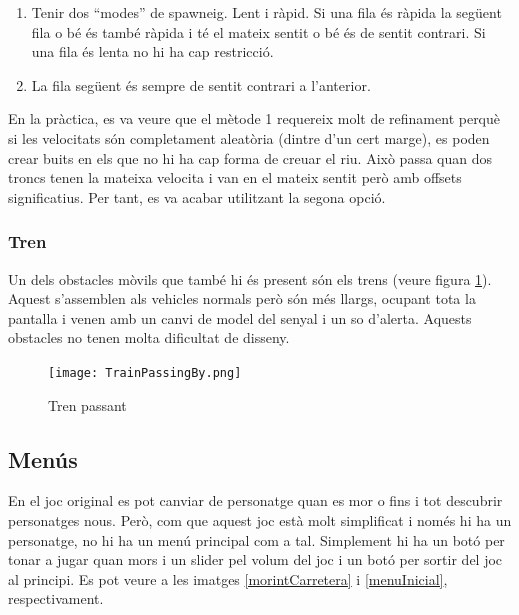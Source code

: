\documentclass{article}
\begin{document}
\begin{enumerate}
	\item Tenir dos ``modes'' de spawneig. Lent i ràpid. Si una fila és
	ràpida la següent fila o bé és també ràpida i té el mateix sentit
	o bé és de sentit contrari. Si una fila és lenta no hi ha cap restricció.
	\item La fila següent és sempre de sentit contrari a l'anterior.
\end{enumerate}
En la pràctica, es va veure que el mètode 1 requereix molt de refinament perquè
si les velocitats són completament aleatòria (dintre d'un cert marge), es poden
crear buits en els que no hi ha cap forma de creuar el riu. Això passa quan
dos troncs tenen la mateixa velocita i van en el mateix sentit però amb offsets
significatius. Per tant, es va acabar utilitzant la segona opció.

\subsubsection{Tren}

Un dels obstacles mòvils que també hi és present són els trens (veure figura 
\ref{trenPassant}). Aquest s'assemblen als vehicles normals però són més 
llargs, ocupant tota la pantalla i venen amb un canvi de model del senyal
i un so d'alerta. Aquests obstacles no tenen molta dificultat de disseny.

\begin{figure}[h!]
	\texttt{[image: TrainPassingBy.png]}
	\caption{Tren passant}
	\label{trenPassant}
\end{figure}

\subsection{Menús}

En el joc original es pot canviar de personatge quan es mor o fins i tot 
descubrir personatges nous. Però, com que aquest joc està molt simplificat i només
hi ha un personatge, no hi ha un menú principal com a tal. Simplement
hi ha un botó per tonar a jugar quan mors i un slider pel volum del joc
i un botó per sortir del joc al principi. Es pot veure
a les imatges \ref{morintCarretera} i \ref{menuInicial}, respectivament.
\end{document}

